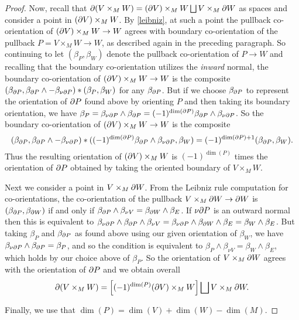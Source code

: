 \begin{proof}
	Now, recall that $\partial(V \times_M W) = (\partial V) \times_M W \bigsqcup V \times_M \partial W$ as spaces and consider a point in $(\partial V) \times_M W$.
	By \cref{leibniz}, at such a point the pullback co-orientation of $(\partial V) \times_M W \to W$ agrees with boundary co-orientation of the pullback $P = V \times_M W \to W$, as described again in the preceding paragraph.
	So continuing to let $(\beta_P,\beta_W)$ denote the pullback co-orientation of $P \to W$ and recalling that the boundary co-orientation utilizes the \textit{inward} normal, the boundary co-orientation of $(\partial V) \times_M W \to W$ is the composite $(\beta_{\partial P}, \beta_{\partial P} \wedge -\beta_{\nu\partial P})*(\beta_P,\beta_W)$ for any $\beta_{\partial P}$.
	But if we choose $\beta_{\partial P}$ to represent the orientation of $\partial P$ found above by orienting $P$ and then taking its boundary orientation, we have $\beta_P = \beta_{\nu\partial P} \wedge \beta_{\partial P} = (-1)^{\dim(\partial P)}\beta_{\partial P} \wedge \beta_{\nu\partial P}$.
	So the boundary co-orientation of $(\partial V) \times_M W \to W$ is the composite
	$$(\beta_{\partial P}, \beta_{\partial P} \wedge -\beta_{\nu\partial P})*((-1)^{\dim(\partial P)}\beta_{\partial P} \wedge \beta_{\nu\partial P},\beta_W) = (-1)^{\dim(\partial P)+1}(\beta_{\partial P},\beta_W).$$
	Thus the resulting orientation of $(\partial V) \times_M W$ is $(-1)^{\dim(P)}$ times the orientation of $\partial P$ obtained by taking the oriented boundary of $V \times_M W$.

	Next we consider a point in $V \times_M \partial W$.
	From the Leibniz rule computation for co-orientations, the co-orientation of the pullback $V \times_M \partial W \to \partial W$ is $(\beta_{\partial P},\beta_{\partial W})$ if and only if $\beta_{\partial P} \wedge \beta_{\nu V} = \beta_{\partial W} \wedge \beta_E$.
	If $\nu\partial P$ is an outward normal then this is equivalent to $\beta_{\nu\partial P} \wedge \beta_{\partial P} \wedge \beta_{\nu V} = \beta_{\nu\partial P} \wedge \beta_{\partial W} \wedge \beta_E = \beta_W \wedge \beta_E$.
	But taking $\beta_P$ and $\beta_{\partial P}$ as found above using our given orientation of $\beta_W$, we have $\beta_{\nu\partial P} \wedge \beta_{\partial P} = \beta_P$, and so the condition is equivalent to $\beta_{P} \wedge \beta_{\nu V} = \beta_W \wedge \beta_E$, which holds by our choice above of $\beta_P$.
	So the orientation of $V \times_M \partial W$ agrees with the orientation of $\partial P$ and we obtain overall $$\partial(V \times_M W) = \left[(-1)^{\dim(P)} (\partial V) \times_M W\right] \bigsqcup V \times_M \partial W.$$

	Finally, we use that $\dim(P) = \dim(V)+\dim(W)-\dim(M)$.
\end{proof}


